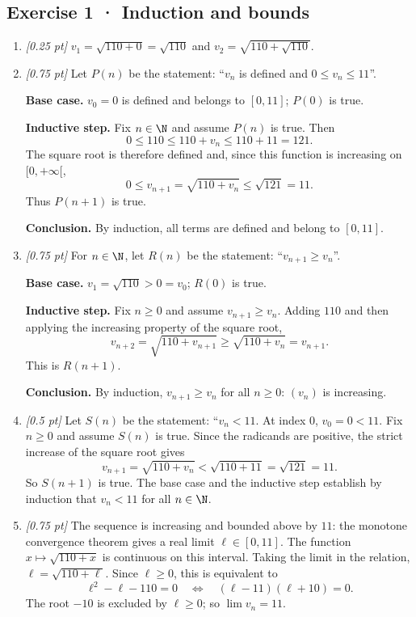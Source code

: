 \subsection*{Exercise 1 · Induction and bounds}\begin{enumerate}

\item \textit{[0.25 pt]} $v_1=\sqrt{110+0}=\sqrt{110}$ and $v_2=\sqrt{110+\sqrt{110}}$.

\item \textit{[0.75 pt]} Let $P(n)$ be the statement: ``$v_n$ is defined and $0\le v_n\le 11$''.
\par\smallskip\textbf{Base case.} $v_0=0$ is defined and belongs to $[0,11]$; $P(0)$ is true.
\par\smallskip\textbf{Inductive step.} Fix $n\in\N$ and assume $P(n)$ is true. Then
\[0\le 110\le 110+v_n\le 110+11=121.\]
The square root is therefore defined and, since this function is increasing on $[0,+\infty[$,
\[0\le v_{n+1}=\sqrt{110+v_n}\le\sqrt{121}=11.\]
Thus $P(n+1)$ is true.
\par\smallskip\textbf{Conclusion.} By induction, all terms are defined and belong to $[0,11]$.

\item \textit{[0.75 pt]} For $n\in\N$, let $R(n)$ be the statement: ``$v_{n+1}\ge v_n$''.
\par\smallskip\textbf{Base case.} $v_1=\sqrt{110}>0=v_0$; $R(0)$ is true.
\par\smallskip\textbf{Inductive step.} Fix $n\ge0$ and assume $v_{n+1}\ge v_n$. Adding $110$ and then applying the increasing property of the square root,
\[v_{n+2}=\sqrt{110+v_{n+1}}\ge\sqrt{110+v_n}=v_{n+1}.\]
This is $R(n+1)$.
\par\smallskip\textbf{Conclusion.} By induction, $v_{n+1}\ge v_n$ for all $n\ge0$: $(v_n)$ is increasing.

\item \textit{[0.5 pt]} Let $S(n)$ be the statement: ``$v_n<11$. At index $0$, $v_0=0<11$.
Fix $n\ge0$ and assume $S(n)$ is true. Since the radicands are positive, the strict increase of the square root gives
\[v_{n+1}=\sqrt{110+v_n}<\sqrt{110+11}=\sqrt{121}=11.\]
So $S(n+1)$ is true. The base case and the inductive step establish by induction that $v_n<11$ for all $n\in\N$.

\item \textit{[0.75 pt]} The sequence is increasing and bounded above by $11$: the monotone convergence theorem gives a real limit $\ell\in[0,11]$.
The function $x\mapsto\sqrt{110+x}$ is continuous on this interval. Taking the limit in the relation, $\ell=\sqrt{110+\ell}$. Since $\ell\ge0$, this is equivalent to
\[\ell^2-\ell-110=0\quad\Longleftrightarrow\quad(\ell-11)(\ell+10)=0.\]
The root $-10$ is excluded by $\ell\ge0$; so $\lim v_n=11$.


\end{enumerate}
